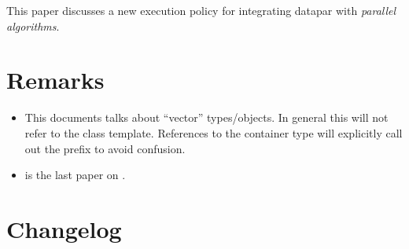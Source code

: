 \newcommand\wgTitle{Integrating datapar with parallel algorithms and executors}
\newcommand\wgName{Matthias Kretz <m.kretz@gsi.de>}
\newcommand\wgDocumentNumber{D0350R1}
\newcommand\wgGroup{SG1}
\newcommand\wgAcknowledgements{
  This work was supported by GSI Helmholtzzentrum für Schwerionenforschung
  and the Hessian LOEWE initiative through the Helmholtz International Center
  for FAIR (HIC for FAIR).
}

\usepackage{vectorpictures}
\usepackage{typenames}
\usepackage{mymacros}
\usepackage{wg21}
\undef\BreakableUnderscore
\usepackage{underscore}



\newcommand\datapar[1][]{\type{datapar#1}\xspace}
\newcommand\valuetype{\type{value\textunderscore{}type}\xspace}
\newcommand\simdcast{\code{datapar\textunderscore{}cast}\xspace}
\newcommand\mask[1][]{\type{mask#1}\xspace}
\newcommand\fixedsizeN{\type{datapar\textunderscore{}abi::fixed\textunderscore{}size<N>}\xspace}
\newcommand\fixedsizescoped{\type{datapar\textunderscore{}abi::fixed\textunderscore{}size}\xspace}
\newcommand\fixedsize{\type{fixed\textunderscore{}size}\xspace}
\newcommand\dataparEP{\type{datapar\textunderscore{}execution}\xspace}
\DeclareRobustCommand\dataparEPT{\type{datapar\textunderscore{}execution\textunderscore{}policy}\xspace}
\newcommand\seqEP{\code{std::}\type{sequential}\xspace}

\newcommand\foralli{for all $i \in [0\ldots \code{size()}[$\xspace}


\begin{wgTitlepage}
  This paper discusses a new execution policy for integrating datapar with \emph{parallel algorithms}.
\end{wgTitlepage}

\pagestyle{scrheadings}
\addtocounter{section}{-1}
\section{Remarks}
\begin{itemize}
  \item This documents talks about “vector” types/objects.
    In general this will not refer to the \std{} class template.
    References to the container type will explicitly call out the  prefix to avoid confusion.
  \item \citep{P0214R1} is the last paper on \datapar.
\end{itemize}

\section{Changelog}





